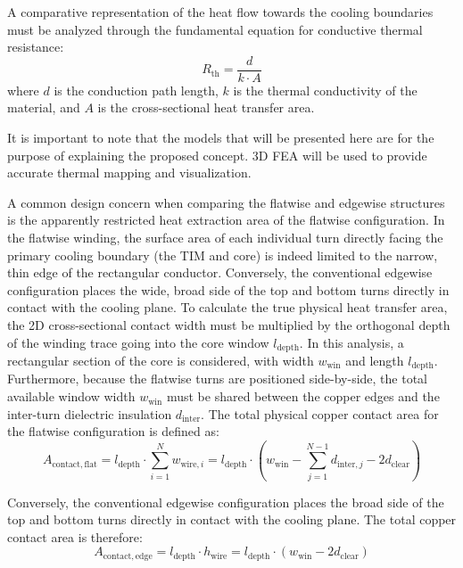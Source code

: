 A comparative representation of the heat flow towards the cooling boundaries must be analyzed through the fundamental equation for conductive thermal resistance:
\begin{equation}
R_{\mathrm{th}} = \frac{d}{k \cdot A}
\label{eq:Rth}
\end{equation}
where $d$ is the conduction path length, $k$ is the thermal conductivity of the material, and $A$ is the cross-sectional heat transfer area. 

It is important to note that the models that will be presented here are for the purpose of explaining the proposed concept. 3D FEA will be used to provide accurate thermal mapping and visualization. 

A common design concern when comparing the flatwise and edgewise structures is the apparently restricted heat extraction area of the flatwise configuration. In the flatwise winding, the surface area of each individual turn directly facing the primary cooling boundary (the TIM and core) is indeed limited to the narrow, thin edge of the rectangular conductor. Conversely, the conventional edgewise configuration places the wide, broad side of the top and bottom turns directly in contact with the cooling plane. 
To calculate the true physical heat transfer area, the 2D cross-sectional contact width must be multiplied by the orthogonal depth of the winding trace going into the core window $l_{\mathrm{depth}}$. In this analysis, a rectangular section of the core is considered, with width $w_\mathrm{win}$ and length $l_\mathrm{depth}$. Furthermore, because the flatwise turns are positioned side-by-side, the total available window width $w_{\mathrm{win}}$ must be shared between the copper edges and the inter-turn dielectric insulation $d_{\mathrm{inter}}$. The total physical copper contact area for the flatwise configuration is defined as:
\begin{equation}
A_{\mathrm{contact, flat}} = l_{\mathrm{depth}} \cdot \sum_{i=1}^{N} w_{\mathrm{wire}, i} = l_{\mathrm{depth}} \cdot \left( w_{\mathrm{win}} - \sum_{j=1}^{N-1} d_{\mathrm{inter}, j} - 2 d_\mathrm{clear}\right)
\end{equation}

Conversely, the conventional edgewise configuration places the broad side of the top and bottom turns directly in contact with the cooling plane. The total copper contact area is therefore:
\begin{equation}
A_{\mathrm{contact, edge}} = l_{\mathrm{depth}} \cdot h_{\mathrm{wire}} = l_{\mathrm{depth}} \cdot \left(w_\mathrm{win} - 2d_\mathrm{clear}\right)
\end{equation}

